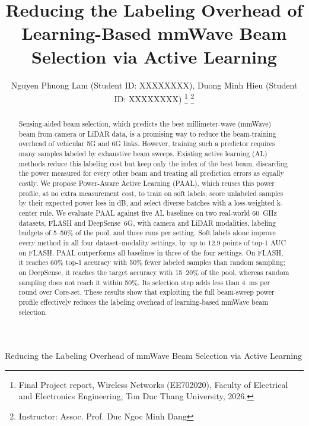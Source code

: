 \documentclass[journal,onecolumn]{IEEEtran}
\begin{document}
\title{Reducing the Labeling Overhead of Learning-Based mmWave Beam Selection via Active Learning}

\author{Nguyen Phuong Lam (Student ID: XXXXXXXX), Duong Minh Hieu (Student ID: XXXXXXXX)
  \thanks{Final Project report, Wireless Networks (EE702020), Faculty of Electrical and Electronics Engineering, Ton Duc Thang University, 2026.}%
\thanks{Instructor: Assoc. Prof. Duc Ngoc Minh Dang }}

%
{Reducing the Labeling Overhead of mmWave Beam Selection via Active Learning}

\maketitle

\begin{abstract}
  Sensing-aided beam selection, which predicts the best millimeter-wave (mmWave) beam from camera or LiDAR data, is a promising way to reduce the beam-training overhead of vehicular 5G and 6G links. However, training such a predictor requires many samples labeled by exhaustive beam sweeps. Existing active learning (AL) methods reduce this labeling cost but keep only the index of the best beam, discarding the power measured for every other beam and treating all prediction errors as equally costly. We propose Power-Aware Active Learning (PAAL), which reuses this power profile, at no extra measurement cost, to train on soft labels, score unlabeled samples by their expected power loss in dB, and select diverse batches with a loss-weighted k-center rule. We evaluate PAAL against five AL baselines on two real-world 60~GHz datasets, FLASH and DeepSense~6G, with camera and LiDAR modalities, labeling budgets of 5--50\% of the pool, and three runs per setting. Soft labels alone improve every method in all four dataset--modality settings, by up to 12.9 points of top-1 AUC on FLASH. PAAL outperforms all baselines in three of the four settings. On FLASH, it reaches 60\% top-1 accuracy with 50\% fewer labeled samples than random sampling; on DeepSense, it reaches the target accuracy with 15--20\% of the pool, whereas random sampling does not reach it within 50\%. Its selection step adds less than 4~ms per round over Core-set. These results show that exploiting the full beam-sweep power profile effectively reduces the labeling overhead of learning-based mmWave beam selection.
\end{abstract}
\end{document}
